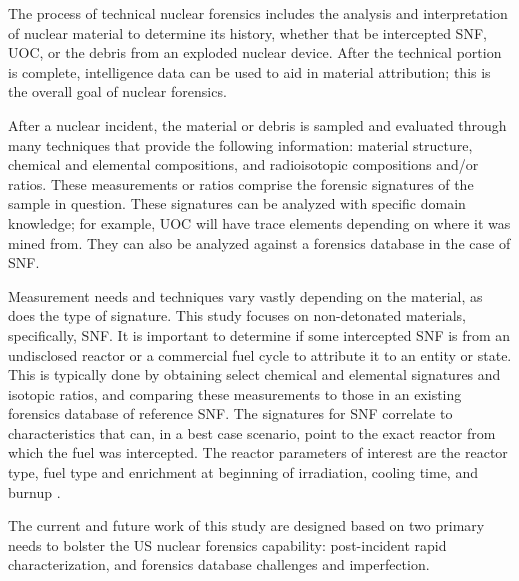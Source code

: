 The process of technical nuclear forensics includes the analysis and
interpretation of nuclear material to determine its history, whether that be
intercepted \gls{SNF}, \gls{UOC}, or the debris from an exploded nuclear
device. After the technical portion is complete, intelligence data can be used
to aid in material attribution; this is the overall goal of nuclear forensics. 

After a nuclear incident, the material or debris is sampled and evaluated
through many techniques that provide the following information: material
structure, chemical and elemental compositions, and radioisotopic compositions
and/or ratios.  These measurements or ratios comprise the forensic signatures
of the sample in question. These signatures can be analyzed with specific
domain knowledge; for example, \gls{UOC} will have trace elements depending on
where it was mined from.  They can also be analyzed against a forensics
database in the case of \gls{SNF}.

Measurement needs and techniques vary vastly depending on the material, as does
the type of signature. This study focuses on non-detonated materials,
specifically, \gls{SNF}. It is important to determine if some intercepted
\gls{SNF} is from an undisclosed reactor or a commercial fuel cycle to
attribute it to an entity or state. This is typically done by obtaining select
chemical and elemental signatures and isotopic ratios, and comparing these
measurements to those in an existing forensics database of reference \gls{SNF}.
The signatures for \gls{SNF} correlate to characteristics that can, in a best
case scenario, point to the exact reactor from which the fuel was intercepted.
The reactor parameters of interest are the reactor type, fuel type and
enrichment at beginning of irradiation, cooling time, and burnup
\cite{weber_2006, weber_2010, weber_2011}.

The current and future work of this study are designed based on two primary
needs to bolster the \gls{US} nuclear forensics capability: post-incident rapid
characterization, and forensics database challenges and imperfection.  

